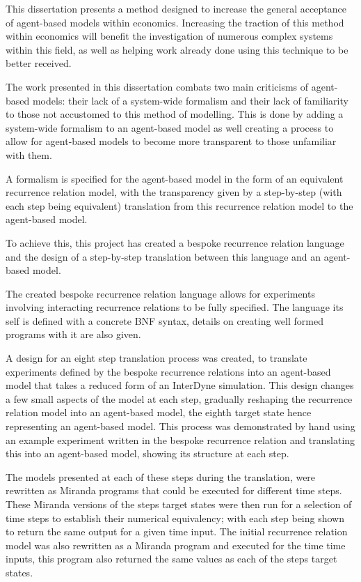 \documentclass{article}
\begin{document}
This dissertation presents a method designed to increase the general acceptance of agent-based models within economics. Increasing the traction of this method within economics will benefit the investigation of numerous complex systems within this field, as well as helping work already done using this technique to be better received. 

The work presented in this dissertation combats two main criticisms of agent-based models: their lack of a system-wide formalism and their lack of familiarity to those not accustomed to this method of modelling. This is done by adding a system-wide formalism to an agent-based model as well creating a process to allow for agent-based models to become more transparent to those unfamiliar with them.

A formalism is specified for the agent-based model in the form of an equivalent recurrence relation model, with the transparency given by a step-by-step (with each step being equivalent) translation from this recurrence relation model to the agent-based model. 

To achieve this, this project has created a bespoke recurrence relation language and the design of a step-by-step translation between this language and an agent-based model.  

The created bespoke recurrence relation language allows for experiments involving interacting recurrence relations to be fully specified. The language its self is defined with a concrete BNF syntax, details on creating well formed programs with it are also given.

A design for an eight step translation process was created, to translate experiments defined by the bespoke recurrence relations into an agent-based model that takes a reduced form of an InterDyne simulation. This design changes a few small aspects of the model at each step, gradually reshaping the recurrence relation model into an agent-based model, the eighth target state hence representing an agent-based model. This process was demonstrated by hand using an example experiment written in the bespoke recurrence relation and translating this into an agent-based model, showing its structure at each step. 

The models presented at each of these steps during the translation, were rewritten as Miranda programs that could be executed for different time steps. These Miranda versions of the steps target states were then run for a selection of time steps to establish their numerical equivalency; with each step being shown to return the same output for a given time input. The initial recurrence relation model was also rewritten as a Miranda program and executed for the time time inputs, this program also returned the same values as each of the steps target states.  
\end{document}
